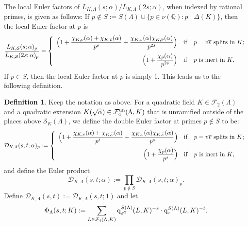 \documentclass[10pt]{article}
\theoremstyle{plain}
\theoremstyle{definition}
\newtheorem{defn}[thm]{Definition}
\theoremstyle{remark}
\def\un{{\rm un}}
\def\val{{\nu}}
\def\FF{{\mathcal F}}
\def\bQ{{\mathbb Q}}
\def\cD{{\mathcal D}}
\def\cF{{\mathcal F}}
\def\bQ{{\mathbb Q}}
\def\cS{{\mathcal S}}
\newcommand{\q}{{\rm q}}
\begin{document}
The local Euler factors of $L_{K,\Lambda}(s; \alpha)/L_{K,\Lambda}(2s;
\alpha)$, when indexed by rational primes, is given as follows: If $p\not\in S:=S(\Lambda) \cup \{p \in
\val(\bQ) : p \mid \Delta(K)\}$, then
the local Euler factor at $p$ is
\begin{equation}\label{eqpcont}
\frac{L_{K,\cS}(s;\alpha)_p}{L_{K,\cS}(2s;\alpha)_p}=\left\{
\begin{array}{rcl}
  \displaystyle\Bigl(1+\frac{\chi_{K,v}(\alpha)+\chi_{K,\overline{v}}(\alpha)}{p^s}+
  \frac{\chi_{K,v}(\alpha)\chi_{K,\overline{v}}(\alpha)}{p^{2s}} \Bigr)
&{\rm if}& p = v\overline{v} \mbox{ splits in $K$}; \\[.15in]
  \displaystyle\Bigl(1+\frac{\chi_p(\alpha)}{p^{2s}} \Bigr)
  &{\rm if}& p \mbox{ is inert}\mbox{ in $K$}.
\end{array}\right.
\end{equation}
If $p \in S$, then the local Euler factor at $p$ is simply $1$. This
leads us to the following definition.
\begin{defn}\label{dirichletfunction}
Keep the notation as above. For a quadratic field $K \in \cF_2(\Lambda)$ and a quadratic extension
$K(\sqrt{\alpha}) \in \cF_4^{\un}(\Lambda,K)$ that is unramified outside of
the places above $\cS_K(\Lambda)$, we define the double Euler factor
at primes $p\not\in S$ to be:
\begin{equation}\label{twovarlocalfactor}
\cD_{K,\Lambda}(s,t;\alpha)_p:= 
\left\{
\begin{array}{rcl}
\displaystyle\Bigl(1+\frac{\chi_{K,v}(\alpha)+\chi_{K,\overline{v}}(\alpha)}{p^t}+
\frac{\chi_{K,v}(\alpha)\chi_{K,\overline{v}}(\alpha)}{p^{s}} \Bigr)
&{\rm if}& p = v\overline{v} \mbox{ splits in $K$;} \\[.15in]
\displaystyle\Bigl(1+\frac{\chi_p(\alpha)}{p^{s}} \Bigr)
&{\rm if}& p \mbox{ is inert in $K$},
\end{array}\right.
\end{equation}
and define the Euler product
\begin{equation}\label{twovarzfunctiontriv}
  \cD_{K,\Lambda}(s,t;\alpha):=\prod_{p\notin S}
  \cD_{K,\Lambda}(s,t;\alpha)_p.
\end{equation}
Define
$\cD_{K,\Lambda}(s,t) := \cD_{K,\Lambda}(s,t;1)$
and let
\begin{equation}\label{twovarphi}
\Phi_{\Lambda}(s,t;K) := \displaystyle\sum_{L\in
  \FF_4(\Lambda,K)}
\q_{\sigma^2}^{S(\Lambda)}(L,K)^{-s}\cdot\q_{\tau}^{S(\Lambda)}(L,K)^{-t}.
\end{equation}
\end{defn}
\end{document}

